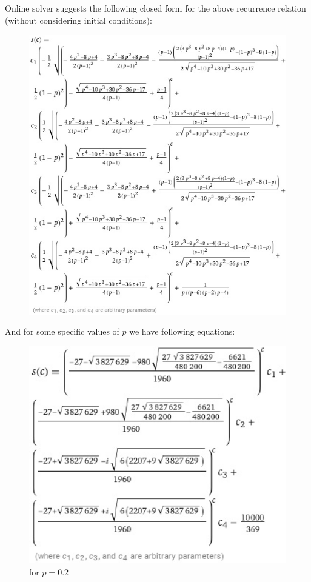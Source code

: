 \documentclass[]{book}
\theoremstyle{definition}
\begin{document}
Online solver suggests the following closed form for the above recurrence relation (without considering initial conditions):
\begin{figure}[H]
    \centering
    \includegraphics[width=1\textwidth]{figures/equation_1.jpg}
    \caption{}
\end{figure}
And for some specific values of $p$ we have following equations:
\begin{figure}[H]
    \centering
    \includegraphics[width=1\textwidth]{figures/equation_2.jpg}
    \caption{for $p=0.2$}
\end{figure}
\end{document}
